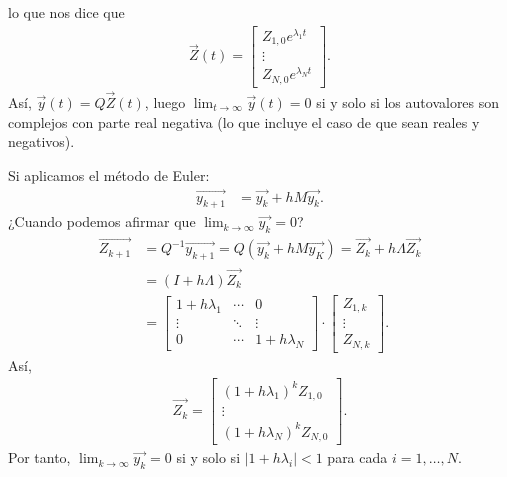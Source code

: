 lo que nos dice que
\begin{align*}
    \overrightarrow{Z}(t) = \begin{bmatrix}
                                Z_{1,0}e^{\lambda_1 t} \\
                                \vdots                 \\
                                Z_{N,0}e^{\lambda_N t}
                            \end{bmatrix}.
\end{align*}
Así, $\overrightarrow{y}(t) = Q\overrightarrow{Z}(t)$, luego $\lim_{t \to \infty} \overrightarrow{y}(t) = 0$ si y solo si los autovalores son complejos con parte real negativa (lo que incluye el caso de que sean reales y negativos).

Si aplicamos el método de Euler:
\begin{align*}
    \overrightarrow{y_{k+1}} & = \overrightarrow{y_k} + hM\overrightarrow{y_k}.
\end{align*}
¿Cuando podemos afirmar que $\lim_{k \to \infty} \overrightarrow{y_k} = 0$?
\begin{align*}
    \overrightarrow{Z_{k+1}} & = Q^{-1}\overrightarrow{y_{k+1}} = Q(\overrightarrow{y_{k}} + hM\overrightarrow{y_K}) = \overrightarrow{Z_k} + h\Lambda\overrightarrow{Z_k} \\
                             & = (I +h\Lambda)\overrightarrow{Z_k}                                                                                                         \\
                             & = \begin{bmatrix}
                                     1 + h\lambda_1 & \cdots & 0            \\
                                     \vdots         & \ddots & \vdots       \\
                                     0              & \cdots & 1+h\lambda_N
                                 \end{bmatrix} \cdot \begin{bmatrix}
                                                         Z_{1,k} \\
                                                         \vdots  \\
                                                         Z_{N,k}
                                                     \end{bmatrix}.
\end{align*}
Así,
\begin{align*}
    \overrightarrow{Z_k} = \begin{bmatrix}
                               (1+h\lambda_1)^kZ_{1,0} \\
                               \vdots                  \\
                               (1+h\lambda_N)^kZ_{N,0}
                           \end{bmatrix}.
\end{align*}
Por tanto, $\lim_{k \to \infty} \overrightarrow{y_k} = 0$ si y solo si $|1+h\lambda_i|< 1 $ para cada $i = 1,\ldots,N$.

